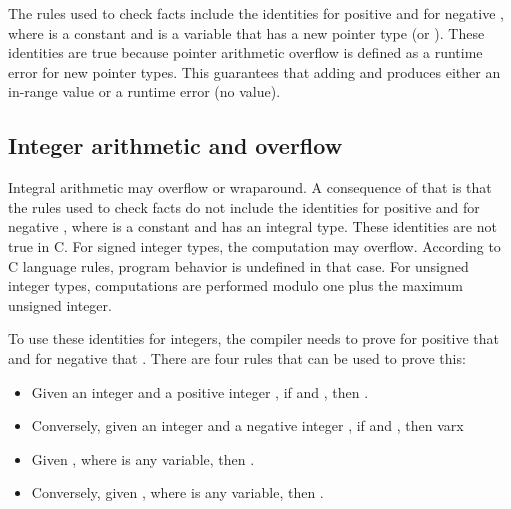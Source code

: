 The rules used to check facts include the identities  \code{<}  \code{+} 
for positive  and  \code{+}  \code{<}  for
negative , where  is a
constant and  is a variable that has a new pointer type (\ptr or \arrayptr).
These identities are true
because pointer arithmetic overflow is defined as a runtime error for
new pointer types. This guarantees that adding  and  produces either
an in-range value or a runtime error (no value).

\subsection{Integer arithmetic and overflow}
\label{section:where-clauses-and-overflow}

Integral arithmetic may overflow or wraparound. A consequence of that is
that the rules used to check facts do not include the identities 
 \code{<}  \code{+}  
for positive  and  \code{+}  \code{<}  for 
negative , where  is a
constant and  has an integral type. These identities are not true in C.  For signed integer types, the computation  \code{+} 
may overflow.   According to C language
rules, program behavior is undefined in that case.  For unsigned
integer types, computations are performed modulo one plus
the maximum unsigned integer.

To use these identities for integers, the compiler needs to prove for
positive  that  \code{+}   and for negative  that
  \code{+} .  There are four rules that can be used to prove this:

\begin{itemize}
\item
  Given an integer  and a positive integer , if 
   \code{<=}  and  \code{+}  ,
  then  \code{+}  .
\item
  Conversely, given an integer  and a negative integer 
  , if  \code{<=}  and  \code{+}
    , then var{x} \code{+}  
\item
  Given  \code{<} , where  is any variable, 
  then  .
\item
  Conversely, given  \code{>} , where 
  is any variable, then  .
\end{itemize}

